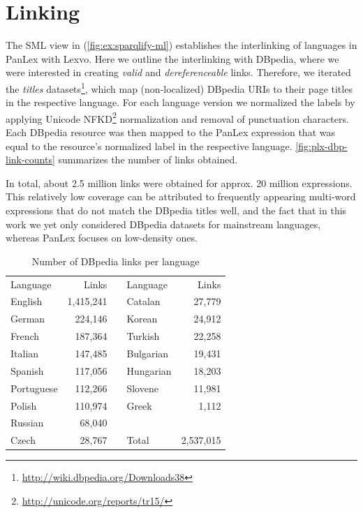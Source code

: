 \documentclass[sw]{iosart2c}
\begin{document}
\section{Linking}
\label{sec:linking}
The SML view in (\autoref{fig:ex:sparqlify-ml}) establishes the interlinking of languages in PanLex with Lexvo.
Here we outline the interlinking with DBpedia, where we were interested in creating \emph{valid} and \emph{dereferenceable} links.
Therefore, we iterated the \emph{titles} datasets\footnote{\url{http://wiki.dbpedia.org/Downloads38}}, which map (non-localized) DBpedia URIs to their page titles in the respective language.
For each language version we normalized the labels by applying Unicode NFKD\footnote{\url{http://unicode.org/reports/tr15/}} normalization and removal of punctuation characters.
Each DBpedia resource was then mapped to the PanLex expression that was equal to the resource's normalized label in the respective language.
\autoref{fig:plx-dbp-link-counts} summarizes the number of links obtained.

In total, about 2.5 million links were obtained for approx. 20 million expressions.
This relatively low coverage can be attributed to frequently appearing multi-word expressions that do not match the DBpedia titles well, and the fact that in this work we yet only considered DBpedia datasets for mainstream languages, whereas PanLex focuses on low-density ones.

\begin{table}
  \centering\begin{scriptsize}

  \begin{tabular}{lrclr}
    Language   &   Links   && Language  & Links     \\
    \cline{1-2}\cline{4-5}
    English    & 1,415,241 && Catalan   &    27,779 \\
    German     &   224,146 && Korean    &    24,912 \\
    French     &   187,364 && Turkish   &    22,258 \\
    Italian    &   147,485 && Bulgarian &    19,431 \\
    Spanish    &   117,056 && Hungarian &    18,203 \\
    Portuguese &   112,266 && Slovene   &    11,981 \\
    Polish     &   110,974 && Greek     &     1,112 \\
    \cline{4-5}
    Russian    &    68,040 \\
    Czech      &    28,767 && Total     & 2,537,015 \\
  \end{tabular}
  \end{scriptsize}
  \caption{Number of DBpedia links per language}
  \label{fig:plx-dbp-link-counts}
\end{table}
\end{document}
